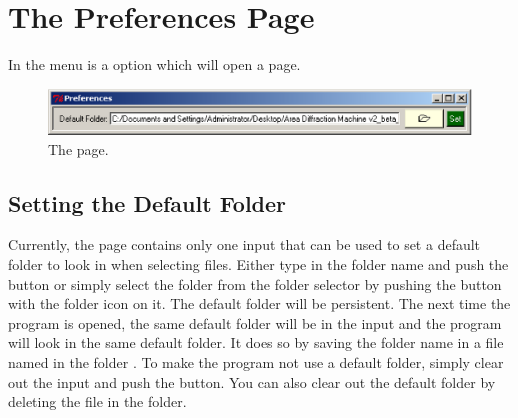 \chapter{The Preferences Page}

In the  menu is a  option 
which will open a  page.

\begin{figure}
    \centering
    \includegraphics[scale=.75]{figures/preferences_page.eps}
    \caption{The  page.}
    \label{divide_up_image}
\end{figure}

\section{Setting the Default Folder}

Currently, the  page contains only one input 
 that can be used to set a default folder to
look in when selecting files. Either type in the folder name and push
the  button or simply select the folder from the folder selector
by pushing the button with the folder icon on it. The default folder 
will be persistent. The next time the program is opened, the same default 
folder will be in the input and the program will look in the same default
folder. It does so by saving the folder name in a file named 
 in the folder .
To make the program not use a default folder, 
simply clear out the input and push the  button.
You can also clear out the default folder by deleting the 
 file in the  folder.


